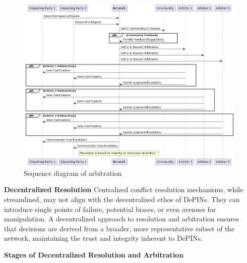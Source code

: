 \documentclass{article}
\begin{document}
\begin{figure}[ht]
  \centering
  \includegraphics[scale=0.4]{diagram4}
  \caption{Sequence diagram of arbitration}
\end{figure}

\textbf{Decentralized Resolution}
Centralized conflict resolution mechanisms, while streamlined, may not align with the decentralized ethos of DePINs. They can introduce single points of failure, potential biases, or even avenues for manipulation. A decentralized approach to resolution and arbitration ensures that decisions are derived from a broader, more representative subset of the network, maintaining the trust and integrity inherent to DePINs.

\textbf{Stages of Decentralized Resolution and Arbitration}
\end{document}
